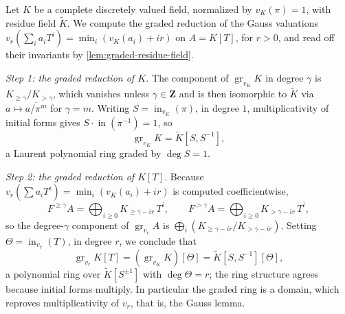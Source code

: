 \begin{example}\label{ex:graded-gauss}
Let $K$ be a complete discretely valued field, normalized by
$v_K(\pi)=1$, with residue field $\widetilde K$. We compute the graded
reduction of the Gauss valuations
$v_r(\sum_ia_iT^i)=\min_i(v_K(a_i)+ir)$ on $A=K[T]$, for $r>0$, and read
off their invariants by \cref{lem:graded-residue-field}.

\emph{Step 1: the graded reduction of $K$.} The component of
$\operatorname{gr}_{v_K}K$ in degree $\gamma$ is
$K_{\geq\gamma}/K_{>\gamma}$, which vanishes unless $\gamma\in\mathbf Z$
and is then isomorphic to $\widetilde K$ via $a\mapsto\overline{a/\pi^m}$
for $\gamma=m$. Writing $S=\operatorname{in}_{v_K}(\pi)$, in degree $1$,
multiplicativity of initial forms gives
$S\cdot\operatorname{in}(\pi^{-1})=1$, so
\[
 \operatorname{gr}_{v_K}K=\widetilde K[S,S^{-1}],
\]
a Laurent polynomial ring graded by $\deg S=1$.

\emph{Step 2: the graded reduction of $K[T]$.} Because
$v_r(\sum a_iT^i)=\min_i(v_K(a_i)+ir)$ is computed coefficientwise,
\[
 F^{\geq\gamma}A=\bigoplus_{i\geq0}K_{\geq\gamma-ir}\,T^i,
 \qquad
 F^{>\gamma}A=\bigoplus_{i\geq0}K_{>\gamma-ir}\,T^i,
\]
so the degree-$\gamma$ component of $\operatorname{gr}_{v_r}A$ is
$\bigoplus_i(K_{\geq\gamma-ir}/K_{>\gamma-ir})$. Setting
$\Theta=\operatorname{in}_{v_r}(T)$, in degree $r$, we conclude that
\[
 \operatorname{gr}_{v_r}K[T]
 =(\operatorname{gr}_{v_K}K)[\Theta]
 =\widetilde K[S,S^{-1}][\Theta],
\]
a polynomial ring over $\widetilde K[S^{\pm1}]$ with $\deg\Theta=r$; the
ring structure agrees because initial forms multiply. In particular the
graded ring is a domain, which reproves multiplicativity of $v_r$, that is,
the Gauss lemma.


\end{example}
